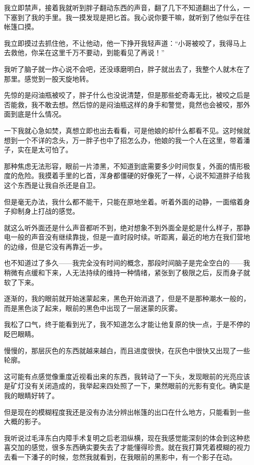 我立即禁声，接着我就听到胖子翻动东西的声音，翻了几下不知道翻出了什么，一下塞到了我的手里。我一摸发现是把匕首。我心说你要干嘛，就听到了他似乎在往帐篷口摸。

我立即摸过去抓住他，不让他动，他一下挣开我轻声道：“小哥被咬了，我得马上去救他，你呆在这里千万不要动，到能看见了再说！”

我听了脑子就一炸心说不会吧，还没琢磨明白，胖子就出去了，我整个人就木在了那里。感觉到一股天旋地转。

先惊的是闷油瓶被咬了，胖子什么也没说清楚，但是那些蛇奇毒无比，被咬之后是否能救，我不敢去想。然后惊的是闷油瓶这样的身手和警觉，竟然也会被咬，那外面到底是什么情况。

一下我就心急如焚，真想立即也出去看看，可是他娘的却什么都看不见。这时候就想到一个不详的念头，万一胖子也中了招怎么办，他娘的我一个人在这里，带着潘子，实在是太可怕了。

那种焦虑无法形容，眼前一片漆黑，不知道到底需要多少时间恢复，外面的情形极度的危险。我摸着手里的匕首，浑身都僵硬的好像死了一样，心说不知道胖子给我这个东西是让我自杀还是自卫。

但是毫无办法，我什么都不能干，只能在原地坐着。听着外面的动静，一面缩着身子抑制身上打战的感觉。

就这么听外面还是什么声音都听不到，绝对想象不到外面全是蛇是什么样子，那静电一般的声音没有继续靠拢，但是一直时段时续。听距离，最近的地方在我们营地的边缘，但是它没有再靠近一步。

也不知道过了多久——我完全没有时间的概念，那段时间脑子是完全空白的——我稍微有点缓和下来，人无法持续的维持一种情绪，紧张到了极限之后，反而身子就软了下来。

逐渐的，我的眼前就开始迷蒙起来，黑色开始消退了，但是不是那种潮水一般的，而是黑色淡了起来，眼前的黑色中出现了一层迷蒙的灰雾。

我松了口气，终于能看到光了，我不知道怎么才能让他复原的快一点，于是不停的眨巴眼睛。

慢慢的，那层灰色的东西就越来越白，而且进度很快，在灰色中很快又出现了一些轮廓。

这可能有点感觉像重度近视看出来的东西，我转动了一下头，发现眼前的光亮应该是矿灯没有关闭造成的，我举起来四处照了一下，果然眼前的光影有变化。确实是我的眼睛好转了。

但是现在的模糊程度我还是没有办法分辨出帐篷的出口在什么地方，只能看到一些大概的影子。

我听说过毛泽东白内障手术复明之后老泪纵横，现在我感觉能深刻的体会到这种悲喜交加的感觉，很多东西确实要失去了才能懂得珍贵。就在我打算凭着模糊的视力去看一下潘子的时候，忽然我就看到，在我眼前的黑影中，有一个影子在动。

